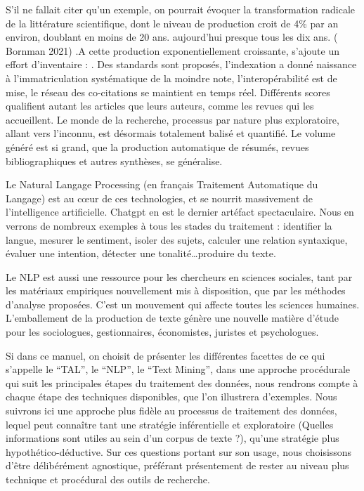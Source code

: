 \documentclass[
  letterpaper,
  DIV=11,
  numbers=noendperiod]{scrreprt}
\begin{document}
S'il ne fallait citer qu'un exemple, on pourrait évoquer la
transformation radicale de la littérature scientifique, dont le niveau
de production croit de 4\% par an environ, doublant en moins de 20 ans.
aujourd'hui presque tous les dix ans. ( Bornman 2021) .A cette
production exponentiellement croissante, s'ajoute un effort d'inventaire
: . Des standards sont proposés, l'indexation a donné naissance à
l'immatriculation systématique de la moindre note, l'interopérabilité
est de mise, le réseau des co-citations se maintient en temps réel.
Différents scores qualifient autant les articles que leurs auteurs,
comme les revues qui les accueillent. Le monde de la recherche,
processus par nature plus exploratoire, allant vers l'inconnu, est
désormais totalement balisé et quantifié. Le volume généré est si grand,
que la production automatique de résumés, revues bibliographiques et
autres synthèses, se généralise.

Le Natural Langage Processing (en français Traitement Automatique du
Langage) est au cœur de ces technologies, et se nourrit massivement de
l'intelligence artificielle. Chatgpt en est le dernier artéfact
spectaculaire. Nous en verrons de nombreux exemples à tous les stades du
traitement : identifier la langue, mesurer le sentiment, isoler des
sujets, calculer une relation syntaxique, évaluer une intention,
détecter une tonalité\ldots produire du texte.

Le NLP est aussi une ressource pour les chercheurs en sciences sociales,
tant par les matériaux empiriques nouvellement mis à disposition, que
par les méthodes d'analyse proposées. C'est un mouvement qui affecte
toutes les sciences humaines. L'emballement de la production de texte
génère une nouvelle matière d'étude pour les sociologues, gestionnaires,
économistes, juristes et psychologues.

Si dans ce manuel, on choisit de présenter les différentes facettes de
ce qui s'appelle le ``TAL'', le ``NLP'', le ``Text Mining'', dans une
approche procédurale qui suit les principales étapes du traitement des
données, nous rendrons compte à chaque étape des techniques disponibles,
que l'on illustrera d'exemples. Nous suivrons ici une approche plus
fidèle au processus de traitement des données, lequel peut connaître
tant une stratégie inférentielle et exploratoire (Quelles informations
sont utiles au sein d'un corpus de texte ?), qu'une stratégie plus
hypothético-déductive. Sur ces questions portant sur son usage, nous
choisissons d'être délibérément agnostique, préférant présentement de
rester au niveau plus technique et procédural des outils de recherche.
\end{document}
